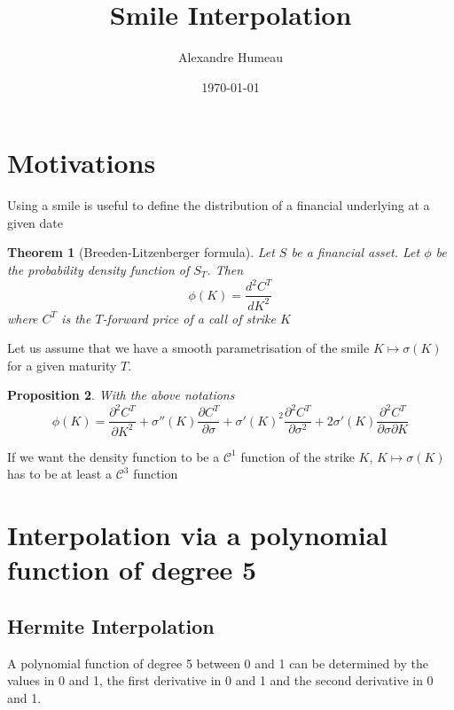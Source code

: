 \documentclass{article}
\newtheorem{theorem}{Theorem}[section]
\newtheorem{proposition}[theorem]{Proposition}
\begin{document}
\title{Smile Interpolation}
\author{Alexandre Humeau}
\date{\today}
\maketitle

\section{Motivations}
Using a smile is useful to define the distribution of a financial underlying at a given date

\begin{theorem}[Breeden-Litzenberger formula]
	Let $S$ be a financial asset. Let $\phi$ be the probability density function of $S_T$. Then
	\begin{equation}
		\phi(K) = \frac{d^2C^T}{dK^2}
	\end{equation}
	where $C^T$ is the $T$-forward price of a call of strike $K$
\end{theorem}

\noindent Let us assume that we have a smooth parametrisation of the smile $K \mapsto \sigma(K)$ for a given maturity $T$.

\begin{proposition}
	With the above notations
	\begin{equation}
		\phi(K) = \frac{\partial ^2 C^T}{\partial K^2} + \sigma''(K) \frac{\partial C^T}{\partial \sigma} + \sigma'(K)^2 \frac{\partial^2 C^T}{\partial \sigma^2} + 2 \sigma'(K) \frac{\partial^2 C^T}{\partial \sigma \partial K} 
	\end{equation}
\end{proposition}

If we want the density function to be a $\mathcal{C}^1$ function of the strike $K$, $K\mapsto \sigma(K)$ has to be at least a $\mathcal{C}^3$ function

\section{Interpolation via a polynomial function of degree 5}
\subsection{Hermite Interpolation}

A polynomial function of degree 5 between 0 and 1 can be determined by the values in 0 and 1, the first derivative in 0 and 1 and the second derivative in 0 and 1.
\end{document}

